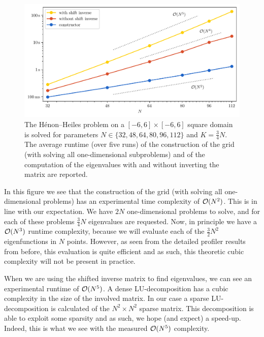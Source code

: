 \begin{figure}
    \begin{center}
        \includegraphics[width=\textwidth]{img/chapter4/benchmark/benchmark_timings.pdf}
    \end{center}
    \caption{The Hénon--Heiles problem on a $[-6,6] \times [-6,6]$ square domain is solved for parameters $N \in \{32,48,64,80,96,112\}$ and $K = \frac{3}{4}N$. The average runtime (over five runs) of the construction of the grid (with solving all one-dimensional subproblems) and of the computation of the eigenvalues with and without inverting the matrix are reported.\label{fig:c4_benchmark_timings}}
\end{figure}

In this figure we see that the construction of the grid (with solving all one-dimensional problems) has an experimental time complexity of $\operatorname{\mathcal{O}}(N^2)$. This is in line with our expectation. We have $2 N$ one-dimensional problems to solve, and for each of these problems $\frac{3}{4}N$ eigenvalues are requested. Now, in principle we have a $\operatorname{\mathcal{O}}(N^3)$ runtime complexity, because we will evaluate each of the $\frac{3}{2} N^2$ eigenfunctions in $N$ points. However, as seen from the detailed profiler results from before, this evaluation is quite efficient and as such, this theoretic cubic complexity will not be present in practice.

When we are using the shifted inverse matrix to find eigenvalues, we can see an experimental runtime of $\operatorname{\mathcal{O}}(N^5)$. A dense LU-decomposition has a cubic complexity in the size of the involved matrix. In our case a sparse LU-decomposition is calculated of the $N^2 \times N^2$ sparse matrix. This decomposition is able to exploit some sparsity and as such, we hope (and expect) a speed-up. Indeed, this is what we see with the measured $\operatorname{\mathcal{O}}(N^5)$ complexity.

